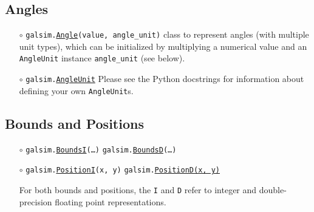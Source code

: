 \documentclass[preprint,10pt]{../../devel/modules/aastex}
\begin{document}
\subsection{Angles}\label{sect:angles}
\begin{itemize}

\item[$\circ$] \texttt{galsim.\href{http://galsim-developers.github.io/GalSim/classgalsim_1_1_angle.html}{Angle}(value, angle\_unit)} \newline
  {class to represent angles (with multiple unit types),
    which can be initialized by multiplying a numerical
    value and an \texttt{AngleUnit} instance \texttt{angle\_unit} (see
    below).}

\item[$\circ$] \texttt{galsim.\href{http://galsim-developers.github.io/GalSim/classgalsim_1_1_angle_unit.html}{AngleUnit}} 
 Please see the Python docstrings for information about defining your
 own \texttt{AngleUnit}s.
\end{itemize}

\subsection{Bounds and Positions}\label{sect:bounds}

\begin{itemize}

\item[$\circ$] \texttt{galsim.\href{http://galsim-developers.github.io/GalSim/classgalsim_1_1_bounds.html}{BoundsI}(\dots)} \newline
  \texttt{galsim.\href{http://galsim-developers.github.io/GalSim/classgalsim_1_1_bounds.html}{BoundsD}(\dots)} 

\item[$\circ$] \texttt{galsim.\href{http://galsim-developers.github.io/GalSim/classgalsim_1_1_position.html}{PositionI}(x, y)} \newline
  \texttt{galsim.\href{http://galsim-developers.github.io/GalSim/classgalsim_1_1_position.html}{PositionD(x, y)}} 

For both bounds and positions, the \texttt{I} and \texttt{D} refer to
integer and double-precision floating point representations.

\end{itemize}
\end{document}
